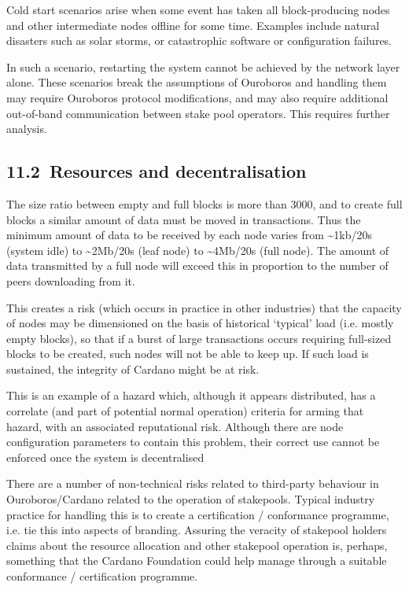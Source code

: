\documentclass[11pt,a4paper]{article}
\begin{document}
Cold start scenarios arise when some event has taken all block-producing
nodes and other intermediate nodes offline for some time. Examples
include natural disasters such as solar storms, or catastrophic software
or configuration failures.

In such a scenario, restarting the system cannot be achieved by the
network layer alone. These scenarios break the assumptions of Ouroboros
and handling them may require Ouroboros protocol modifications, and may
also require additional out-of-band communication between stake pool
operators. This requires further analysis.

\hypertarget{resources-and-decentralisation}{%
\subsection{​11.2​~Resources and
decentralisation}\label{resources-and-decentralisation}}

The size ratio between empty and full blocks is more than 3000, and to
create full blocks a similar amount of data must be moved in
transactions. Thus the minimum amount of data to be received by each
node varies from \textasciitilde{}1kb/20s (system idle) to
\textasciitilde{}2Mb/20s (leaf node) to \textasciitilde{}4Mb/20s (full
node). The amount of data transmitted by a full node will exceed this in
proportion to the number of peers downloading from it.

This creates a risk (which occurs in practice in other industries) that
the capacity of nodes may be dimensioned on the basis of historical
`typical' load (i.e. mostly empty blocks), so that if a burst of large
transactions occurs requiring full-sized blocks to be created, such
nodes will not be able to keep up. If such load is sustained, the
integrity of Cardano might be at risk.

This is an example of a hazard which, although it appears distributed,
has a correlate (and part of potential normal operation) criteria for
arming that hazard, with an associated reputational risk. Although there
are node configuration parameters to contain this problem, their correct
use cannot be enforced once the system is decentralised

There are a number of non-technical risks related to third-party
behaviour in Ouroboros/Cardano related to the operation of stakepools.
Typical industry practice for handling this is to create a certification
/ conformance programme, i.e. tie this into aspects of branding.
Assuring the veracity of stakepool holders claims about the resource
allocation and other stakepool operation is, perhaps, something that the
Cardano Foundation could help manage through a suitable conformance /
certification programme.
\end{document}
